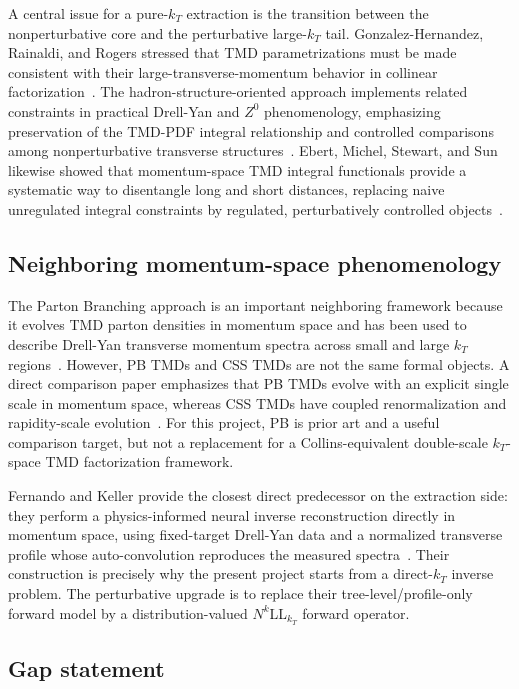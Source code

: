 \documentclass[11pt]{article}
\begin{document}
A central issue for a pure-$k_T$ extraction is the transition between the nonperturbative core
and the perturbative large-$k_T$ tail. Gonzalez-Hernandez, Rainaldi, and Rogers stressed
that TMD parametrizations must be made consistent with their large-transverse-momentum
behavior in collinear factorization~\cite{GonzalezHernandezRainaldiRogers2023}. The
hadron-structure-oriented approach implements related constraints in practical Drell-Yan and
$Z^0$ phenomenology, emphasizing preservation of the TMD-PDF integral relationship and
controlled comparisons among nonperturbative transverse structures~\cite{AslanBoglioneGHRRainaldiRogersSimonelli2024}.
Ebert, Michel, Stewart, and Sun likewise showed that momentum-space TMD integral
functionals provide a systematic way to disentangle long and short distances, replacing naive
unregulated integral constraints by regulated, perturbatively controlled objects~\cite{EbertMichelStewartSun2022}.

\subsection{Neighboring momentum-space phenomenology}

The Parton Branching approach is an important neighboring framework because it evolves
TMD parton densities in momentum space and has been used to describe Drell-Yan transverse
momentum spectra across small and large $k_T$ regions~\cite{BubanjaEtAl2024PB}.
However, PB TMDs and CSS TMDs are not the same formal objects. A direct comparison
paper emphasizes that PB TMDs evolve with an explicit single scale in momentum space,
whereas CSS TMDs have coupled renormalization and rapidity-scale evolution~\cite{BermudezMartinez2023PBtoCSS}.
For this project, PB is prior art and a useful comparison target, but not a replacement for a
Collins-equivalent double-scale $k_T$-space TMD factorization framework.

Fernando and Keller provide the closest direct predecessor on the extraction side: they
perform a physics-informed neural inverse reconstruction directly in momentum space, using
fixed-target Drell-Yan data and a normalized transverse profile whose auto-convolution
reproduces the measured spectra~\cite{FernandoKeller2026}. Their construction is precisely
why the present project starts from a direct-$k_T$ inverse problem. The perturbative upgrade
is to replace their tree-level/profile-only forward model by a distribution-valued
$N^k$LL$_{k_T}$ forward operator.

\subsection{Gap statement}
\end{document}
